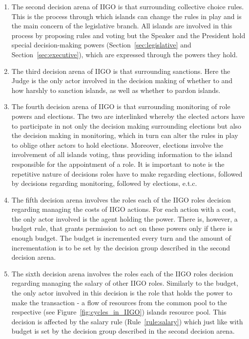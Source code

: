 \begin{itemize}
\begin{enumerate}
        \item The second decision arena of IIGO is that surrounding collective choice rules. This is the process through which islands can change the rules in play and is the main concern of the legislative branch. All islands are involved in this process by proposing rules and voting but the Speaker and the President hold special decision-making powers (Section~\ref*{sec:legislative} and Section~\ref*{sec:executive}), which are expressed through the powers they hold.
        
        \item The third decision arena of IIGO is that surrounding sanctions. Here the Judge is the only actor involved in the decision making of whether to and how harshly to sanction islands, as well as whether to pardon islands.
        
        \item The fourth decision arena of IIGO is that surrounding monitoring of role powers and elections. The two are interlinked whereby the elected actors have to participate in not only the decision making surrounding elections but also the decision making in monitoring, which in turn can alter the rules in play to oblige other actors to hold elections. Moreover, elections involve the involvement of all islands voting, thus providing information to the island responsible for the appointment of a role. It is important to note is the repetitive nature of decisions roles have to make regarding elections, followed by decisions regarding monitoring, followed by elections, e.t.c. 
        
        \item The fifth decision arena involves the roles each of the IIGO roles decision regarding managing the costs of IIGO actions. For each action with a cost, the only actor involved is the agent holding the power. There is, however, a budget rule, that grants permission to act on these powers only if there is enough budget. The budget is incremented every turn and the amount of incrementation is to be set by the decision group described in the second decision arena.
        
        \item The sixth decision arena involves the roles each of the IIGO roles decision regarding managing the salary of other IIGO roles. Similarly to the budget, the only actor involved in this decision is the role that holds the power to make the transaction - a flow of resources from the common pool to the respective (see Figure~\ref{fig:cycles_in_IIGO}) islands resource pool. This decision is affected by the salary rule (Rule~\ref{rule:salary}) which just like with budget is set by the decision group described in the second decision arena.
        

\end{enumerate}
\end{itemize}
